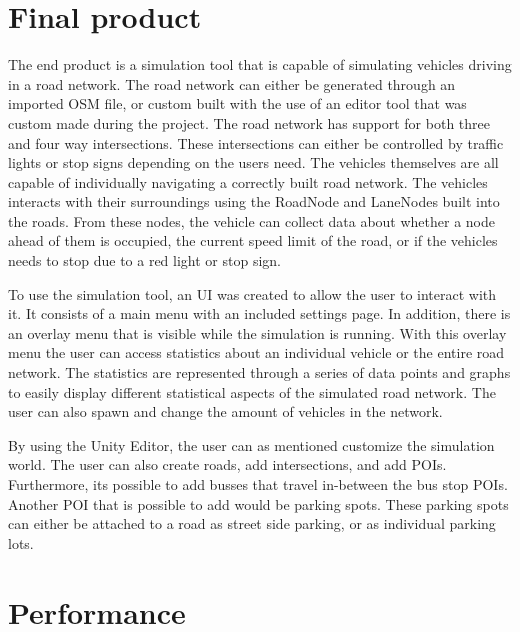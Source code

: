
\section{Final product}
    The end product is a simulation tool that is capable of simulating vehicles driving in a road network. The road network can either be generated through an imported OSM file, or custom built with the use of an editor tool that was custom made during the project. The road network has support for both three and four way intersections. These intersections can either be controlled by traffic lights or stop signs depending on the users need. The vehicles themselves are all capable of individually navigating a correctly built road network. The vehicles interacts with their surroundings using the RoadNode and LaneNodes built into the roads. From these nodes, the vehicle can collect data about whether a node ahead of them is occupied, the current speed limit of the road, or if the vehicles needs to stop due to a red light or stop sign. 

    To use the simulation tool, an UI was created to allow the user to interact with it. It consists of a main menu with an included settings page. In addition, there is an overlay menu that is visible while the simulation is running. With this overlay menu the user can access statistics about an individual vehicle or the entire road network. The statistics are represented through a series of data points and graphs to easily display different statistical aspects of the simulated road network. The user can also spawn and change the amount of vehicles in the network. 

    By using the Unity Editor, the user can as mentioned customize the simulation world. The user can also create roads, add intersections, and add POIs. Furthermore, its possible to add busses that travel in-between the bus stop POIs. Another POI that is possible to add would be parking spots. These parking spots can either be attached to a road as street side parking, or as individual parking lots. 


\section{Performance}

